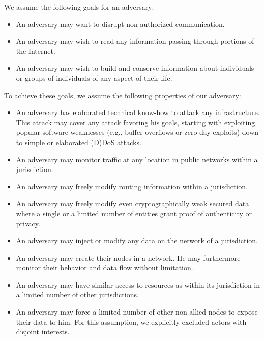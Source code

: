 We assume the following goals for an adversary:
\begin{itemize}
	\item An adversary may want to disrupt non-authorized communication.
	\item An adversary may wish to read any information passing through portions of the Internet.
	\item An adversary may wish to build and conserve information about individuals or groups of individuals of any aspect of their life. 
\end{itemize}

To achieve these goals, we assume the following properties of our adversary:
\begin{itemize}
	\item An adversary has elaborated technical know-how to attack any infrastructure. This attack may cover any attack favoring his goals, starting with exploiting popular software weaknesses (e.g., buffer overflows or zero-day exploits) down to simple or elaborated (D)DoS attacks.
	
	\item An adversary may monitor traffic at any location in public networks within a jurisdiction.
	
	\item An adversary may freely modify routing information within a jurisdiction.
	
	\item An adversary may freely modify even cryptographically weak secured data where a single or a limited number of entities grant proof of authenticity or privacy.
	\item An adversary may inject or modify any data on the network of a jurisdiction.
	
	\item An adversary may create their nodes in a network. He may furthermore monitor their behavior and data flow without limitation.
	
	\item An adversary may have similar access to resources as within its jurisdiction in a limited number of other jurisdictions.
	
	\item An adversary may force a limited number of other non-allied nodes to expose their data to him. For this assumption, we explicitly excluded actors with disjoint interests.
	
\end{itemize}

